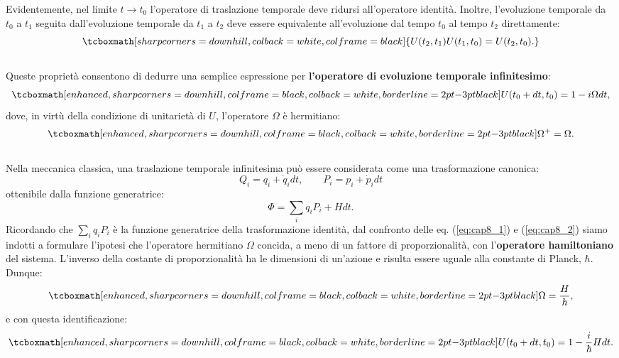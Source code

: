 Evidentemente, nel limite $t\longrightarrow t_0$ l'operatore di traslazione temporale deve ridursi all'operatore identità. Inoltre, l'evoluzione temporale da $t_0$ a $t_1$ seguita dall'evoluzione temporale da $t_1$ a $t_2$ deve essere equivalente all'evoluzione dal tempo $t_0$ al tempo $t_2$ direttamente:
	\begin{equation}
		\tcboxmath[sharp corners=downhill, colback=white, colframe=black]{
			U (t_2,t_1) U(t_1,t_0)=U(t_2,t_0).
			}
	\end{equation}\\
	
Queste proprietà consentono di dedurre una semplice espressione per \textbf{l'operatore di evoluzione temporale infinitesimo}:
	\begin{equation}
		\tcboxmath[enhanced, sharp corners=downhill, colframe=black, colback=white, borderline={2pt}{-3pt}{black}]{
			U(t_0+dt,t_0) = 1-i\Omega dt,
			}
		\label{eq:cap8_1}
	\end{equation}
dove, in virtù della condizione di unitarietà di $U$, l'operatore $\Omega$ è hermitiano:
	\begin{equation}
		\tcboxmath[enhanced, sharp corners=downhill, colframe=black, colback=white, borderline={2pt}{-3pt}{black}]{
			\Omega ^+ = \Omega.
			}
	\end{equation}\\
	
Nella meccanica classica, una traslazione temporale infinitesima può essere considerata come una trasformazione canonica:
\begin{equation}
Q_i = q_i+\dot{q}_idt, \qquad P_i = p_i+\dot{p}_idt
\end{equation}
ottenibile dalla funzione generatrice:
\begin{equation}
\Phi = \sum _i q_iP_i+ Hdt.
\label{eq:cap8_2}
\end{equation}
Ricordando che $\sum _i q_iP_i$ è la funzione generatrice della trasformazione identità, dal confronto delle eq. (\ref{eq:cap8_1}) e (\ref{eq:cap8_2}) siamo indotti a formulare l'ipotesi che l'operatore hermitiano $\Omega$ concida, a meno di un fattore di proporzionalità, con l'\textbf{operatore hamiltoniano} del sistema. L'inverso della costante di proporzionalità ha le dimensioni di un'azione e risulta essere uguale alla constante di Planck, $\hbar$. Dunque:
	\begin{equation}
		\tcboxmath[enhanced, sharp corners=downhill, colframe=black, colback=white, borderline={2pt}{-3pt}{black}]{
		\Omega = \frac{H}{\hbar},
		}
	\end{equation}
e con questa identificazione:
	\begin{equation}
		\tcboxmath[enhanced, sharp corners=downhill, colframe=black, colback=white, borderline={2pt}{-3pt}{black}]{
			U(t_0+dt,t_0) =1-\frac{i}{\hbar}Hdt.
			}
	\end{equation}
	
